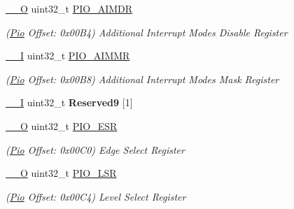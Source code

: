 \begin{DoxyCompactItemize}
\mbox{\label{structPio_a963a13471d082a6256133d3af6b29a8e}} 
\mbox{\hyperlink{core__cm7_8h_a7e25d9380f9ef903923964322e71f2f6}{\+\_\+\+\_\+O}} uint32\+\_\+t \mbox{\hyperlink{structPio_a963a13471d082a6256133d3af6b29a8e}{P\+I\+O\+\_\+\+A\+I\+M\+DR}}
\begin{DoxyCompactList}\small\item\em (\mbox{\hyperlink{structPio}{Pio}} Offset\+: 0x00\+B4) Additional Interrupt Modes Disable Register \end{DoxyCompactList}\item 
\mbox{\label{structPio_adf47ee2ec1b6537a36aec03874861900}} 
\mbox{\hyperlink{core__cm7_8h_af63697ed9952cc71e1225efe205f6cd3}{\+\_\+\+\_\+I}} uint32\+\_\+t \mbox{\hyperlink{structPio_adf47ee2ec1b6537a36aec03874861900}{P\+I\+O\+\_\+\+A\+I\+M\+MR}}
\begin{DoxyCompactList}\small\item\em (\mbox{\hyperlink{structPio}{Pio}} Offset\+: 0x00\+B8) Additional Interrupt Modes Mask Register \end{DoxyCompactList}\item 
\mbox{\label{structPio_ae00eac9291ddb8eb4b5e378ec60e47d4}} 
\mbox{\hyperlink{core__cm7_8h_af63697ed9952cc71e1225efe205f6cd3}{\+\_\+\+\_\+I}} uint32\+\_\+t {\bfseries Reserved9} \mbox{[}1\mbox{]}
\item 
\mbox{\label{structPio_a320344c6bdfebcd8ebc90e6cad8f8545}} 
\mbox{\hyperlink{core__cm7_8h_a7e25d9380f9ef903923964322e71f2f6}{\+\_\+\+\_\+O}} uint32\+\_\+t \mbox{\hyperlink{structPio_a320344c6bdfebcd8ebc90e6cad8f8545}{P\+I\+O\+\_\+\+E\+SR}}
\begin{DoxyCompactList}\small\item\em (\mbox{\hyperlink{structPio}{Pio}} Offset\+: 0x00\+C0) Edge Select Register \end{DoxyCompactList}\item 
\mbox{\label{structPio_a58eafc812324751636939a85bc7f4a64}} 
\mbox{\hyperlink{core__cm7_8h_a7e25d9380f9ef903923964322e71f2f6}{\+\_\+\+\_\+O}} uint32\+\_\+t \mbox{\hyperlink{structPio_a58eafc812324751636939a85bc7f4a64}{P\+I\+O\+\_\+\+L\+SR}}
\begin{DoxyCompactList}\small\item\em (\mbox{\hyperlink{structPio}{Pio}} Offset\+: 0x00\+C4) Level Select Register \end{DoxyCompactList}\item 

\end{DoxyCompactItemize}
